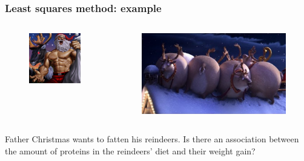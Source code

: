 \documentclass{beamer}
\begin{document}
\begin{frame}
  \frametitle{Least squares method: example}
  \begin{columns}
    \begin{column}{0.5\textwidth}

      \begin{figure}
        \centering
        \includegraphics[width=1.00\textwidth]{img/les3-santa.png}
        \label{fig:les3-santa}
      \end{figure}

    \end{column}
    \begin{column}{0.5\textwidth}

      \begin{figure}
        \centering
        \includegraphics[width=1.00\textwidth]{img/les3-reindeer.jpg}
        \label{fig:les3-reindeer}
      \end{figure}

    \end{column}
  \end{columns}

  Father Christmas wants to fatten his reindeers. Is there an association
  between the amount of proteins in the reindeers' diet and their weight gain?
\end{frame}
\end{document}
